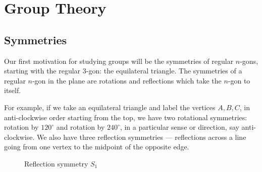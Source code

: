 \chapter{Group Theory}
\label{ch:groups}

\section{Symmetries}

Our first motivation for studying groups will be the symmetries of regular $n$-gons, starting with the regular $3$-gon: the equilateral triangle. The symmetries of a regular $n$-gon in the plane are rotations and reflections which take the $n$-gon to itself.

For example, if we take an equilateral triangle and label the vertices $A, B, C$, in anti-clockwise order starting from the top, we have two rotational symmetries: rotation by $120^\circ$ and rotation by $240^\circ$, in a particular sense or direction, say anti-clockwise. We also have three reflection symmetries --- reflections across a line going from one vertex to the midpoint of the opposite edge.

\begin{figure}[ht!]
    \centering
\caption{Reflection symmetry $S_1$}
\label{fig:triangle-reflection}
\end{figure}

